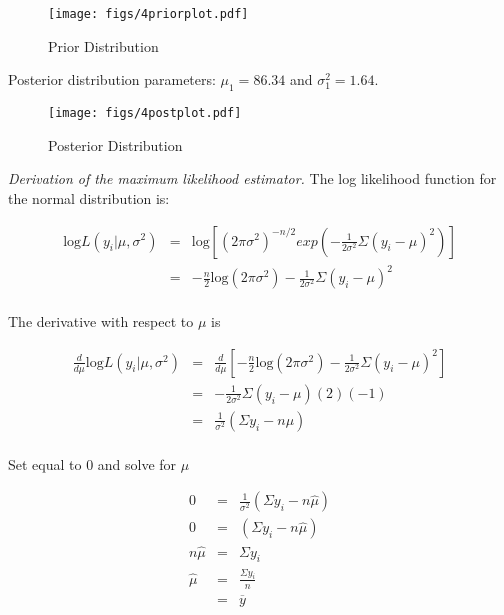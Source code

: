 \documentclass[12pt]{article}
\newcommand{\ybar}{\overline{y}}
\begin{document}
\begin{figure}[H]
\begin{center}
\texttt{[image: figs/4priorplot.pdf]}
\caption{Prior Distribution}
\end{center}
\end{figure}

\noindent Posterior distribution parameters: $\mu_1=86.34$ and $\sigma_1^2=1.64$.

\begin{figure}[H]
\begin{center}
\texttt{[image: figs/4postplot.pdf]}
\caption{Posterior Distribution}
\end{center}
\end{figure}

\noindent \textit{Derivation of the maximum likelihood estimator.}  The log likelihood function for the normal distribution is:

\begin{eqnarray*}
\mathrm{log}L(y_i|\mu,\sigma^2) &=& \mathrm{log}\left[(2\pi\sigma^2)^{-n/2}exp\left(-\frac{1}{2\sigma^2}\Sigma(y_i-\mu)^2\right)\right] \\
&=& -\frac{n}{2}\mathrm{log}(2\pi\sigma^2)-\frac{1}{2\sigma^2}\Sigma(y_i-\mu)^2 \\
\end{eqnarray*}

The derivative with respect to $\mu$ is

\begin{eqnarray*}
\frac{d}{d\mu}\mathrm{log}L(y_i|\mu,\sigma^2) &=& \frac{d}{d\mu}\left[-\frac{n}{2}\mathrm{log}(2\pi\sigma^2)-\frac{1}{2\sigma^2}\Sigma(y_i-\mu)^2\right] \\
&=& -\frac{1}{2\sigma^2}\Sigma(y_i-\mu)(2)(-1) \\
&=& \frac{1}{\sigma^2}(\Sigma y_i-n\mu) \\
\end{eqnarray*}

Set equal to 0 and solve for $\hat{\mu}$

\begin{eqnarray*}
0 &=& \frac{1}{\sigma^2}(\Sigma y_i-n\hat{\mu}) \\
0 &=& (\Sigma y_i-n\hat{\mu}) \\
n\hat{\mu} &=& \Sigma y_i \\
\hat{\mu} &=& \frac{\Sigma y_i}{n} \\
&=& \ybar \\
\end{eqnarray*}
\end{document}
